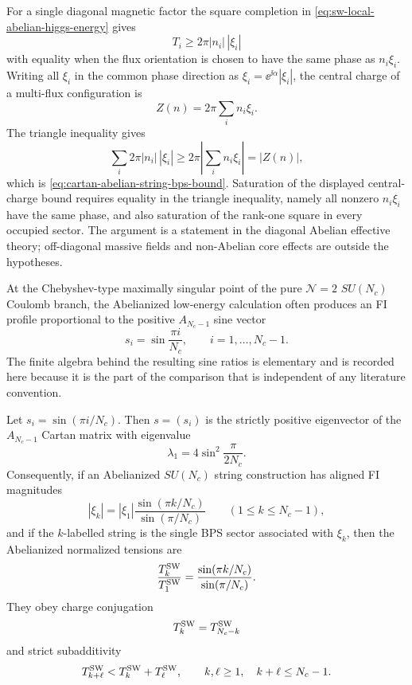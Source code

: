 For a single diagonal magnetic factor the square completion in
\eqref{eq:sw-local-abelian-higgs-energy} gives
\[
  T_i\ge 2\pi |n_i|\,|\xi_i|
\]
with equality when the flux orientation is chosen to have the same phase as
\(n_i\xi_i\).
Writing all \(\xi_i\) in the common phase direction as
\(\xi_i=\ee^{\ii\alpha}|\xi_i|\), the central charge of a multi-flux
configuration is
\[
  Z(n)=2\pi\sum_i n_i\xi_i .
\]
The triangle inequality gives
\[
  \sum_i2\pi |n_i|\,|\xi_i|
  \ge
  2\pi\left|\sum_i n_i\xi_i\right|
  =
  |Z(n)|,
\]
which is \eqref{eq:cartan-abelian-string-bps-bound}.  Saturation of the
displayed central-charge bound requires equality in the triangle inequality,
namely all nonzero \(n_i\xi_i\) have the same phase, and also saturation of
the rank-one square in every occupied sector.  The argument is a statement in
the diagonal Abelian effective theory; off-diagonal massive fields and
non-Abelian core effects are outside the hypotheses.

At the Chebyshev-type maximally singular point of the pure
\(\mathcal N=2\) \(SU(N_c)\) Coulomb branch, the Abelianized low-energy
calculation often produces an FI profile proportional to the positive
\(A_{N_c-1}\) sine vector
\begin{equation}
  s_i=\sin\frac{\pi i}{N_c},\qquad i=1,\ldots,N_c-1.
  \label{eq:an-sine-vector}
\end{equation}
The finite algebra behind the resulting sine ratios is elementary and is
recorded here because it is the part of the comparison that is independent of
any literature convention.

\begin{example}
\label{ex:a-type-sine-profile-k-string}
Let \(s_i=\sin(\pi i/N_c)\).  Then \(s=(s_i)\) is the strictly positive
eigenvector of the \(A_{N_c-1}\) Cartan matrix with eigenvalue
\begin{equation}
  \lambda_1=4\sin^2\frac{\pi}{2N_c}.
  \label{eq:a-type-sine-profile-eigenvalue}
\end{equation}
Consequently, if an Abelianized \(SU(N_c)\) string construction has aligned FI
magnitudes
\begin{equation}
  |\xi_k|=|\xi_1|\frac{\sin(\pi k/N_c)}{\sin(\pi/N_c)}
  \qquad (1\le k\le N_c-1),
  \label{eq:sw-sine-fi-profile}
\end{equation}
and if the \(k\)-labelled string is the single BPS sector associated with
\(\xi_k\), then the Abelianized normalized tensions are
\begin{equation}
  \frac{T_k^{\rm SW}}{T_1^{\rm SW}}
  =
  \frac{\sin(\pi k/N_c)}{\sin(\pi/N_c)}.
  \label{eq:sw-sine-k-string-ratio}
\end{equation}
They obey charge conjugation
\begin{equation}
  T_k^{\rm SW}=T_{N_c-k}^{\rm SW}
  \label{eq:sw-sine-charge-conjugation}
\end{equation}
and strict subadditivity
\begin{equation}
  T_{k+\ell}^{\rm SW}<T_k^{\rm SW}+T_\ell^{\rm SW},
  \qquad
  k,\ell\ge1,\quad k+\ell\le N_c-1 .
  \label{eq:sw-sine-subadditivity}
\end{equation}
\end{example}

